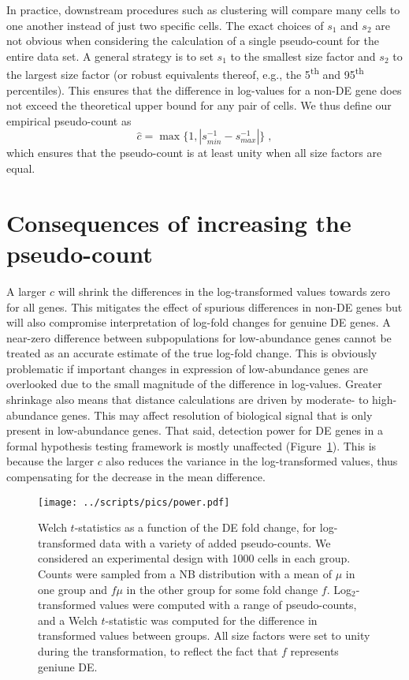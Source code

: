 \documentclass[10pt,letterpaper]{article}
\begin{document}
In practice, downstream procedures such as clustering will compare many cells to one another instead of just two specific cells.
The exact choices of $s_1$ and $s_2$ are not obvious when considering the calculation of a single pseudo-count for the entire data set.
A general strategy is to set $s_1$ to the smallest size factor and $s_2$ to the largest size factor
(or robust equivalents thereof, e.g., the 5\textsuperscript{th} and 95\textsuperscript{th} percentiles).
This ensures that the difference in log-values for a non-DE gene does not exceed the theoretical upper bound for any pair of cells.
We thus define our empirical pseudo-count as
\[
\hat c = \max\{1, |s_{min}^{-1} - s_{max}^{-1}|\} \;,
\]
which ensures that the pseudo-count is at least unity when all size factors are equal.

\section{Consequences of increasing the pseudo-count}
A larger $c$ will shrink the differences in the log-transformed values towards zero for all genes.
This mitigates the effect of spurious differences in non-DE genes but will also compromise interpretation of log-fold changes for genuine DE genes.
A near-zero difference between subpopulations for low-abundance genes cannot be treated as an accurate estimate of the true log-fold change. 
This is obviously problematic if important changes in expression of low-abundance genes are overlooked due to the small magnitude of the difference in log-values.
Greater shrinkage also means that distance calculations are driven by moderate- to high-abundance genes.
This may affect resolution of biological signal that is only present in low-abundance genes.
That said, detection power for DE genes in a formal hypothesis testing framework is mostly unaffected (Figure~\ref{fig:power}).
This is because the larger $c$ also reduces the variance in the log-transformed values, 
thus compensating for the decrease in the mean difference.

\begin{figure}
\begin{center}
\texttt{[image: ../scripts/pics/power.pdf]}
\end{center}
\caption{Welch $t$-statistics as a function of the DE fold change, for log-transformed data with a variety of added pseudo-counts.
We considered an experimental design with 1000 cells in each group.
Counts were sampled from a NB distribution with a mean of $\mu$ in one group and $f\mu$ in the other group for some fold change $f$.
Log$_2$-transformed values were computed with a range of pseudo-counts, and a Welch $t$-statistic was computed for the difference in transformed values between groups.
All size factors were set to unity during the transformation, to reflect the fact that $f$ represents geniune DE. 
}
\label{fig:power}
\end{figure}
\end{document}
